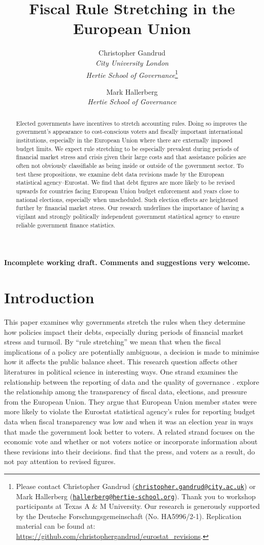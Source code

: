 \documentclass[]{article}
\title{Fiscal Rule Stretching in the European Union}
\author{Christopher Gandrud \\ \emph{City University London} \\ \emph{Hertie School of Governance}\footnote{Please contact Christopher Gandrud
(\href{mailto:christopher.gandrud@city.ac.uk}{\nolinkurl{christopher.gandrud@city.ac.uk}}) or Mark Hallerberg (\href{mailto:hallerberg@hertie-school.org}{\nolinkurl{hallerberg@hertie-school.org}}). Thank you to workshop participants at Texas A \& M University. Our research is generously supported by the Deutsche Forschungsgemeinschaft (No. HA5996/2-1). Replication material can be found at: \url{https://github.com/christophergandrud/eurostat_revisions}.}
\and
Mark Hallerberg \\ \emph{Hertie School of Governance}}
\begin{document}
\maketitle


\begin{center}
    \textbf{Incomplete working draft. Comments and suggestions very welcome.}
\end{center}

\begin{abstract}
Elected governments have incentives to stretch accounting rules. Doing so improves the government’s appearance to cost-conscious voters and fiscally important international institutions, especially in the European Union where there are externally imposed budget limits. We expect rule stretching to be especially prevalent during periods of financial market stress and crisis given their large costs and that assistance policies are often not obviously classifiable as being inside or outside of the government sector. To test these propositions, we examine debt data revisions made by the European statistical agency--Eurostat. We find that debt figures are more likely to be revised upwards for countries facing European Union budget enforcement and years close to national elections, especially when unscheduled. Such election effects are heightened further by financial market stress. Our research underlines the importance of having a vigilant and strongly politically independent government statistical agency to ensure reliable government finance statistics.
\end{abstract}

\section{Introduction}

This paper examines why governments stretch the rules when they determine how policies impact their debts, especially during periods of financial market stress and turmoil. By ``rule stretching'' we mean that when the fiscal implications of a policy are potentially ambiguous, a decision is made to minimise how it affects the public balance sheet. This research question affects other literatures in political science in interesting ways. One strand examines the relationship between the reporting of data and the quality of governance \cite[e.g.][]{Hollyer2014}. \cite{Alt2014} explore the relationship among the transparency of fiscal data, elections, and pressure from the European Union. They argue that European Union member states were more likely to violate the Eurostat statistical agency's rules for reporting budget data when fiscal transparency was low and when it was an election year in ways that made the government look better to voters. A related strand focuses on the economic vote and whether or not voters notice or incorporate information about these revisions into their decisions. \cite{KayserLeininger2015} find that the press, and voters as a result, do not pay attention to revised figures.
\end{document}
